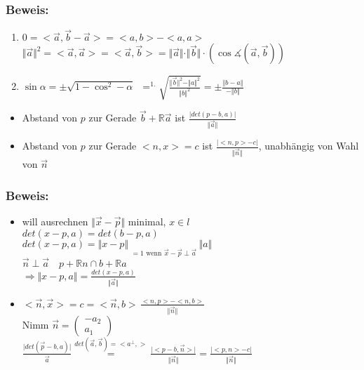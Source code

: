 \subsubsection{Beweis:}
\begin{enumerate}
	\item $0=<\vec{a},\vec{b}-\vec{a}>=<a,b>-<a,a>$\\
	$\Vert\vec{a}\Vert^{2}=<\vec{a},\vec{a}>=<\vec{a},\vec{b}>=
	\Vert\vec{a}\Vert\cdot\Vert\vec{b}\Vert\cdot(\cos\measuredangle(\vec{a},
	\vec{b}))$
	\item $\sin\alpha=\pm\sqrt{1-\cos^{2}-\alpha}$\
		$\mathop{=}^{\text{1.}}\sqrt{\frac{\Vert\vec{b}\Vert^{2}-\Vert a \Vert^{2}}
		{\Vert b \Vert^{2}}} =\pm \frac{\Vert b-a\Vert}{-\Vert b \Vert}$
\end{enumerate}
\begin{itemize}
	\item Abstand von $p$ zur Gerade $\vec{b} + \mathbb{R}\vec{a}$ ist $\frac{\vert 
	det(p-b,a)\vert}{\Vert\vec{a}\Vert}$
	\item Abstand von $p$ zur Gerade $<n,x>=c$ ist $ \frac{\vert <n,p>-c\vert}{\Vert 
	\vec{n}\Vert}$, unabhängig von Wahl von $\vec{n}$
\end{itemize}
%
%
%
\subsubsection{Beweis:}
\begin{itemize}
	\item will ausrechnen $\Vert\vec{x}-\vec{p}\Vert$ minimal, $x \in l$\\
	$det(x-p,a)=det(b-p,a)$\\
	$det(x-p,a)=\Vert x-p\Vert\mathop{\underbrace{\sin\measuredangle(c-
	p,a)}}\limits_{=1\text{ wenn }\vec{x}-\vec{p}\perp\vec{a}}\Vert a\Vert$\\
	$\vec{n}\perp\vec{a} \quad p+\mathbb{R}n \cap b +\mathbb{R}a$\\
	$\Rightarrow \Vert x-p,a\Vert=\frac{det(x-p,a)}{\Vert\vec{a}\Vert}$
	\item $<\vec{n},\vec{x}>=c=<\vec{n},b> \, \frac{<n,p>-<n,b>}{\Vert\vec{n}\Vert}$\\
	Nimm $\vec{n}=\begin{pmatrix} -a_{2} \\ a_{1} \end{pmatrix}$\\
	$\frac{\vert det(\vec{p}-b,a)\vert}{\vec{a}} \mathop{=}\limits^{det(\vec{a},\vec{b})
	=<a^{\perp},>}\frac{\vert <p-b,\vec{n}> \vert}{\Vert\vec{n}\Vert}=\frac{\vert<p,n>-
	c\vert}{\Vert\vec{n}\Vert}$
\end{itemize}
%
%
%
